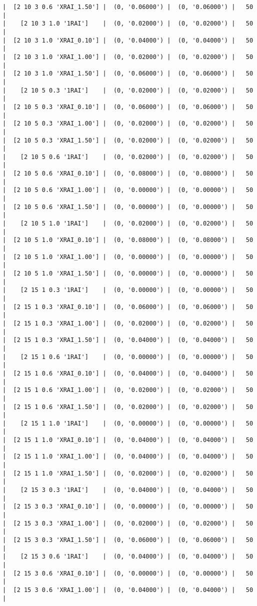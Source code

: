 \documentclass{article}
\begin{document}
\begin{verbatim}
|  [2 10 3 0.6 'XRAI_1.50'] |  (0, '0.06000') |  (0, '0.06000') |   50  |
|    [2 10 3 1.0 '1RAI']    |  (0, '0.02000') |  (0, '0.02000') |   50  |
|  [2 10 3 1.0 'XRAI_0.10'] |  (0, '0.04000') |  (0, '0.04000') |   50  |
|  [2 10 3 1.0 'XRAI_1.00'] |  (0, '0.02000') |  (0, '0.02000') |   50  |
|  [2 10 3 1.0 'XRAI_1.50'] |  (0, '0.06000') |  (0, '0.06000') |   50  |
|    [2 10 5 0.3 '1RAI']    |  (0, '0.02000') |  (0, '0.02000') |   50  |
|  [2 10 5 0.3 'XRAI_0.10'] |  (0, '0.06000') |  (0, '0.06000') |   50  |
|  [2 10 5 0.3 'XRAI_1.00'] |  (0, '0.02000') |  (0, '0.02000') |   50  |
|  [2 10 5 0.3 'XRAI_1.50'] |  (0, '0.02000') |  (0, '0.02000') |   50  |
|    [2 10 5 0.6 '1RAI']    |  (0, '0.02000') |  (0, '0.02000') |   50  |
|  [2 10 5 0.6 'XRAI_0.10'] |  (0, '0.08000') |  (0, '0.08000') |   50  |
|  [2 10 5 0.6 'XRAI_1.00'] |  (0, '0.00000') |  (0, '0.00000') |   50  |
|  [2 10 5 0.6 'XRAI_1.50'] |  (0, '0.00000') |  (0, '0.00000') |   50  |
|    [2 10 5 1.0 '1RAI']    |  (0, '0.02000') |  (0, '0.02000') |   50  |
|  [2 10 5 1.0 'XRAI_0.10'] |  (0, '0.08000') |  (0, '0.08000') |   50  |
|  [2 10 5 1.0 'XRAI_1.00'] |  (0, '0.00000') |  (0, '0.00000') |   50  |
|  [2 10 5 1.0 'XRAI_1.50'] |  (0, '0.00000') |  (0, '0.00000') |   50  |
|    [2 15 1 0.3 '1RAI']    |  (0, '0.00000') |  (0, '0.00000') |   50  |
|  [2 15 1 0.3 'XRAI_0.10'] |  (0, '0.06000') |  (0, '0.06000') |   50  |
|  [2 15 1 0.3 'XRAI_1.00'] |  (0, '0.02000') |  (0, '0.02000') |   50  |
|  [2 15 1 0.3 'XRAI_1.50'] |  (0, '0.04000') |  (0, '0.04000') |   50  |
|    [2 15 1 0.6 '1RAI']    |  (0, '0.00000') |  (0, '0.00000') |   50  |
|  [2 15 1 0.6 'XRAI_0.10'] |  (0, '0.04000') |  (0, '0.04000') |   50  |
|  [2 15 1 0.6 'XRAI_1.00'] |  (0, '0.02000') |  (0, '0.02000') |   50  |
|  [2 15 1 0.6 'XRAI_1.50'] |  (0, '0.02000') |  (0, '0.02000') |   50  |
|    [2 15 1 1.0 '1RAI']    |  (0, '0.00000') |  (0, '0.00000') |   50  |
|  [2 15 1 1.0 'XRAI_0.10'] |  (0, '0.04000') |  (0, '0.04000') |   50  |
|  [2 15 1 1.0 'XRAI_1.00'] |  (0, '0.04000') |  (0, '0.04000') |   50  |
|  [2 15 1 1.0 'XRAI_1.50'] |  (0, '0.02000') |  (0, '0.02000') |   50  |
|    [2 15 3 0.3 '1RAI']    |  (0, '0.04000') |  (0, '0.04000') |   50  |
|  [2 15 3 0.3 'XRAI_0.10'] |  (0, '0.00000') |  (0, '0.00000') |   50  |
|  [2 15 3 0.3 'XRAI_1.00'] |  (0, '0.02000') |  (0, '0.02000') |   50  |
|  [2 15 3 0.3 'XRAI_1.50'] |  (0, '0.06000') |  (0, '0.06000') |   50  |
|    [2 15 3 0.6 '1RAI']    |  (0, '0.04000') |  (0, '0.04000') |   50  |
|  [2 15 3 0.6 'XRAI_0.10'] |  (0, '0.00000') |  (0, '0.00000') |   50  |
|  [2 15 3 0.6 'XRAI_1.00'] |  (0, '0.04000') |  (0, '0.04000') |   50  |

\end{verbatim}
\end{document}
